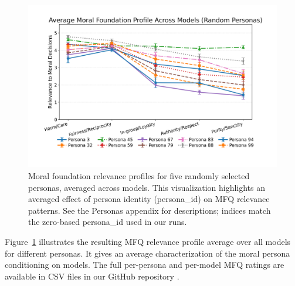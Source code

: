 \documentclass{article}
\begin{document}
\begin{figure}[t]
  \centering
  \includegraphics[width=\linewidth]{../results/persona_moral_foundations_relevance_profiles.png}
  \caption{Moral foundation relevance profiles for five randomly selected personas, averaged across models. This visualization highlights an averaged effect of persona identity (persona\_id) on MFQ relevance patterns. See the Personas appendix for descriptions; indices match the zero-based persona\_id used in our runs.}
  \label{fig:persona-mfq-profiles}
\end{figure}

Figure~\ref{fig:persona-mfq-profiles} illustrates the resulting MFQ relevance profile average over all models for different personas. It gives an average characterization of the moral persona conditioning on models. The full per-persona and per-model MFQ ratings are available in CSV files in our GitHub repository \cite{costa2025llmms}. 
\end{document}
